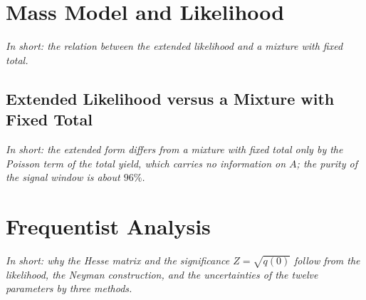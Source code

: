 \FloatBarrier

\section{Mass Model and Likelihood}
\label{app:model}
\emph{In short: the relation between the extended likelihood and a mixture with fixed total.}

\subsection{Extended Likelihood versus a Mixture with Fixed Total}
\label{app:ext_mixture}
\emph{In short: the extended form differs from a mixture with fixed total only by the Poisson term of the total yield, which carries no information on $A$; the purity of the signal window is about $96\%$.}

\FloatBarrier

\section{Frequentist Analysis}
\label{app:freq}
\emph{In short: why the Hesse matrix and the significance $Z=\sqrt{q(0)}$ follow from the likelihood, the Neyman construction, and the uncertainties of the twelve parameters by three methods.}

